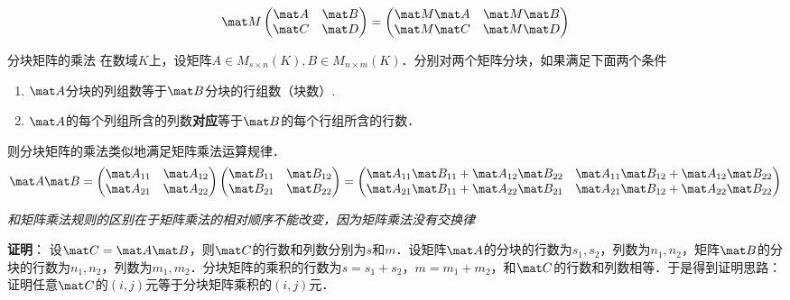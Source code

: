 \begin{equation}
\mat M
\begin{pmatrix}
\mat A & \mat B\\
\mat C & \mat D\\
\end{pmatrix}
=
\begin{pmatrix}
\mat M \mat A & \mat M \mat B\\
\mat M \mat C & \mat M \mat D\\
\end{pmatrix}
\end{equation}


\begin{theorem}{分块矩阵的乘法}
在数域$K$上，设矩阵$A\in{M_{s\times{n}}(K)},B\in{M_{n\times{m}}(K)}$．分别对两个矩阵分块，如果满足下面两个条件
\begin{enumerate}
\item $\mat A$分块的列组数等于$\mat B$分块的行组数（块数）.
\item $\mat A$的每个列组所含的列数\textbf{对应}等于$\mat B$的每个行组所含的行数．
\end{enumerate}
则分块矩阵的乘法类似地满足矩阵乘法运算规律．
\begin{equation}
\mat A\mat B=
\begin{pmatrix}
\mat A_{11} & \mat A_{12}\\
\mat A_{21} & \mat A_{22}
\end{pmatrix}
\begin{pmatrix}
\mat B_{11} & \mat B_{12}\\
\mat B_{21} & \mat B_{22}
\end{pmatrix}
=
\begin{pmatrix}
\mat A_{11}\mat B_{11}+\mat A_{12}\mat B_{22} & \mat A_{11}\mat B_{12}+\mat A_{12}\mat B_{22}\\
\mat A_{21}\mat B_{11}+\mat A_{22}\mat B_{21} & \mat A_{21}\mat B_{12}+\mat A_{22}\mat B_{22}
\end{pmatrix}
\end{equation}
\end{theorem}
\textsl{和矩阵乘法规则的区别在于矩阵乘法的相对顺序不能改变，因为矩阵乘法没有交换律}

\textbf{证明}：
设$\mat C=\mat A\mat B$，则$\mat C$的行数和列数分别为$s$和$m$．设矩阵$\mat A$的分块的行数为$s_1,s_2$，列数为$n_1,n_2$，矩阵$\mat B$的分块的行数为$n_1,n_2$，列数为$m_1,m_2$．分块矩阵的乘积的行数为$s=s_1+s_2$，$m=m_1+m_2$，和$\mat C$的行数和列数相等．于是得到证明思路：证明任意$\mat C$的$(i,j)$元等于分块矩阵乘积的$(i,j)$元．

